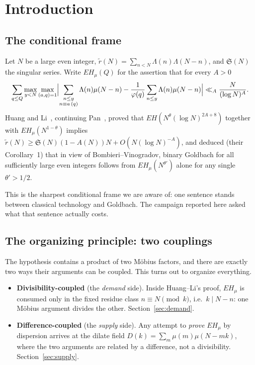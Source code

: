 \documentclass[11pt,a4paper]{article}
\theoremstyle{plain}
\theoremstyle{definition}
\renewcommand{\SS}{\mathfrak{S}}
\begin{document}
\tableofcontents

\section{Introduction}

\subsection{The conditional frame}

Let $N$ be a large even integer,
$\tilde r(N) = \sum_{n<N}\Lambda(n)\Lambda(N-n)$, and $\SS(N)$ the
singular series. Write $EH_\mu(Q)$ for the assertion that for every
$A>0$
\[
  \sum_{q\le Q}\max_{y<N}\max_{(a,q)=1}
  \Bigl|\sum_{\substack{n\le y\\ n\equiv a\,(q)}}\Lambda(n)\mu(N-n)
   -\frac{1}{\varphi(q)}\sum_{n\le y}\Lambda(n)\mu(N-n)\Bigr|
  \ll_A \frac{N}{(\log N)^A}.
\]
Huang and Li~\cite{HL}, continuing Pan~\cite{Pan}, proved that
$EH(N^{\theta}(\log N)^{2A+8})$ together with $EH_\mu(N^{1-\theta})$
implies $\tilde r(N)\ge \SS(N)(1-A(N))N + O(N(\log N)^{-A})$, and
deduced (their Corollary~1) that in view of Bombieri--Vinogradov,
binary Goldbach for all sufficiently large even integers follows from
$EH_\mu(N^{\theta'})$ alone for any single $\theta' > 1/2$.

This is the sharpest conditional frame we are aware of: one sentence
stands between classical technology and Goldbach. The campaign
reported here asked what that sentence actually costs.

\subsection{The organizing principle: two couplings}

The hypothesis contains a product of two M\"obius factors, and there
are exactly two ways their arguments can be coupled. This turns out to
organize everything.

\begin{itemize}
\item \textbf{Divisibility-coupled} (the \emph{demand} side). Inside
  Huang--Li's proof, $EH_\mu$ is consumed only in the fixed residue
  class $n \equiv N \pmod k$, i.e.\ $k \mid N-n$: one M\"obius
  argument divides the other. Section~\ref{sec:demand}.
\item \textbf{Difference-coupled} (the \emph{supply} side). Any attempt
  to \emph{prove} $EH_\mu$ by dispersion arrives at the dilate field
  $D(k) = \sum_m \mu(m)\mu(N-mk)$, where the two arguments are related
  by a difference, not a divisibility. Section~\ref{sec:supply}.
\end{itemize}
\end{document}
